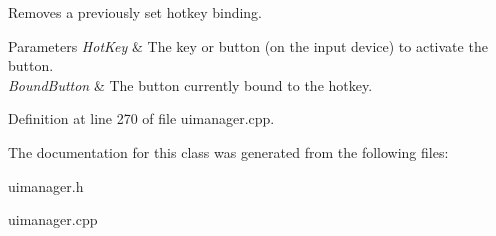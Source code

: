 Removes a previously set hotkey binding. 


\begin{DoxyParams}{Parameters}
{\em HotKey} & The key or button (on the input device) to activate the button. \\
\hline
{\em BoundButton} & The button currently bound to the hotkey. \\
\hline
\end{DoxyParams}


Definition at line 270 of file uimanager.cpp.



The documentation for this class was generated from the following files:\begin{DoxyCompactItemize}
\item 
uimanager.h\item 
uimanager.cpp\end{DoxyCompactItemize}
